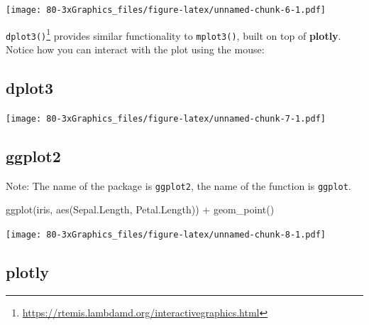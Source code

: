 \documentclass[
]{book}
\newenvironment{Shaded}{\begin{snugshade}}{\end{snugshade}}
\newcommand{\FunctionTok}[1]{\textcolor[rgb]{0.00,0.00,0.00}{#1}}
\newcommand{\NormalTok}[1]{#1}
\newcommand{\SpecialCharTok}[1]{\textcolor[rgb]{0.00,0.00,0.00}{#1}}
\DeclareRobustCommand{\href}[2]{#2\footnote{\url{#1}}}
\begin{document}
\begin{Shaded}
\end{Shaded}

\texttt{[image: 80-3xGraphics\_files/figure-latex/unnamed-chunk-6-1.pdf]}

\href{https://rtemis.lambdamd.org/interactivegraphics.html}{\texttt{dplot3()}} provides similar functionality to \texttt{mplot3()}, built on top of \textbf{plotly}. Notice how you can interact with the plot using the mouse:

\hypertarget{dplot3}{%
\subsection{\texorpdfstring{\textbf{dplot3}}{dplot3}}\label{dplot3}}

\begin{Shaded}
\end{Shaded}

\texttt{[image: 80-3xGraphics\_files/figure-latex/unnamed-chunk-7-1.pdf]}

\hypertarget{ggplot2-1}{%
\subsection{\texorpdfstring{\textbf{ggplot2}}{ggplot2}}\label{ggplot2-1}}

Note: The name of the package is \texttt{ggplot2}, the name of the function is \texttt{ggplot}.

\begin{Shaded}
\begin{Highlighting}[]
\FunctionTok{ggplot}\NormalTok{(iris, }\FunctionTok{aes}\NormalTok{(Sepal.Length, Petal.Length)) }\SpecialCharTok{+} \FunctionTok{geom\_point}\NormalTok{()}
\end{Highlighting}
\end{Shaded}

\texttt{[image: 80-3xGraphics\_files/figure-latex/unnamed-chunk-8-1.pdf]}

\hypertarget{plotly}{%
\subsection{\texorpdfstring{\textbf{plotly}}{plotly}}\label{plotly}}
\end{document}
